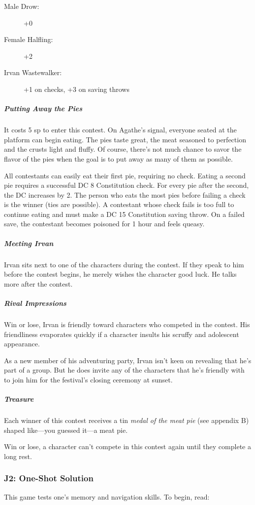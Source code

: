 \documentclass[10pt,a4paper,twoside,fancy,bg=print,twocolumn,openany,nodeprecatedcode]{dndbook}
\begin{document}
\begin{description}
\item[Male Drow:]
+0
\item[Female Halfling:]
+2
\item[Irvan Wastewalker:]
+1 on checks, +3 on saving throws
\end{description}

\subparagraph{Putting Away the Pies}
It costs 5 sp to enter this contest. On Agathe's signal, everyone seated at the platform can begin eating. The pies taste great, the meat seasoned to perfection and the crusts light and fluffy. Of course, there's not much chance to savor the flavor of the pies when the goal is to put away as many of them as possible.

All contestants can easily eat their first pie, requiring no check. Eating a second pie requires a successful DC 8 Constitution check. For every pie after the second, the DC increases by 2. The person who eats the most pies before failing a check is the winner (ties are possible). A contestant whose check fails is too full to continue eating and must make a DC 15 Constitution saving throw. On a failed save, the contestant becomes poisoned for 1 hour and feels queasy.

\subparagraph{Meeting Irvan}
Irvan sits next to one of the characters during the contest. If they speak to him before the contest begins, he merely wishes the character good luck. He talks more after the contest.

\subparagraph{Rival Impressions}
Win or lose, Irvan is friendly toward characters who competed in the contest. His friendliness evaporates quickly if a character insults his scruffy and adolescent appearance.

As a new member of his adventuring party, Irvan isn't keen on revealing that he's part of a group. But he does invite any of the characters that he's friendly with to join him for the festival's closing ceremony at sunset.

\subparagraph{Treasure}
Each winner of this contest receives a tin \textit{medal of the meat pie} (see appendix B) shaped like—you guessed it—a meat pie.

Win or lose, a character can't compete in this contest again until they complete a long rest.

\subsubsection{J2: One-Shot Solution}
This game tests one's memory and navigation skills. To begin, read:
\end{document}
